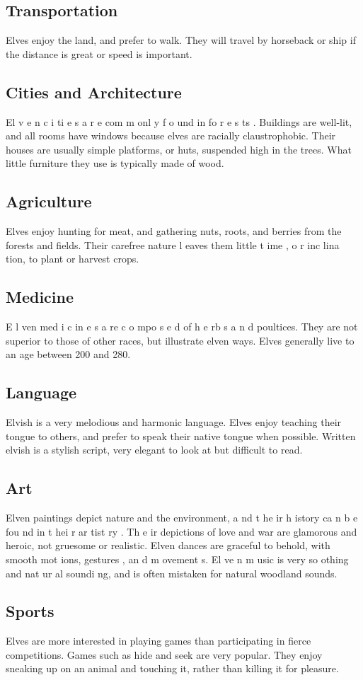 \begin{multicols*}{2}
\subsection{Transportation}
Elves enjoy the land, and prefer to walk. They will
travel by horseback or ship if the distance is great or speed is
important.
\subsection{Cities and Architecture}
El v e n c i ti e s a r e com m onl y f o und in fo r e s ts .
Buildings are well-lit, and all rooms have windows because
elves are racially claustrophobic. Their houses are usually
simple platforms, or huts, suspended high in the trees. What
little furniture they use is typically made of wood.
\subsection{Agriculture}
Elves enjoy hunting for meat, and gathering nuts,
roots, and berries from the forests and fields. Their carefree
nature l eaves them little t ime , o r inc lina tion, to plant or
harvest crops.
\subsection{Medicine}
E l ven med i c in e s a re c o mpo s e d of h e rb s a n d
poultices. They are not superior to those of other races, but
illustrate elven ways. Elves generally live to an age between
200 and 280.
\subsection{Language}
Elvish is a very melodious and harmonic language.
Elves enjoy teaching their tongue to others, and prefer to
speak their native tongue when possible. Written elvish is a
stylish script, very elegant to look at but difficult to read.
\subsection{Art}
Elven paintings depict nature and the environment,
a nd t he ir h istory ca n b e fou nd in t hei r ar tist ry . Th e ir
depictions of love and war are glamorous and heroic, not
gruesome or realistic.
Elven dances are graceful to behold, with smooth
mot ions, gestures , an d m ovement s. El ve n m usic is very
so othing and nat ur al soundi ng, and is often mistaken for
natural woodland sounds.
\subsection{Sports}
Elves are more interested in playing games than
participating in fierce competitions. Games such as hide and
seek are very popular. They enjoy sneaking up on an animal
and touching it, rather than killing it for pleasure.

\end{multicols*}
